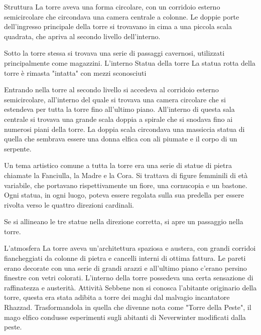 \documentclass{article}
\begin{document}
Struttura\newline
La torre aveva una forma circolare, con un corridoio esterno semicircolare che circondava una camera centrale a colonne. Le doppie porte dell'ingresso principale della torre si trovavano in cima a una piccola scala quadrata, che apriva al secondo livello dell'interno.

Sotto la torre stessa si trovava una serie di passaggi cavernosi, utilizzati principalmente come magazzini.\newline
L'interno\newline
Statua della torre
La statua rotta della torre è rimasta "intatta" con mezzi sconosciuti

Entrando nella torre al secondo livello si accedeva al corridoio esterno semicircolare, all'interno del quale si trovava una camera circolare che si estendeva per tutta la torre fino all'ultimo piano. All'interno di questa sala centrale si trovava una grande scala doppia a spirale che si snodava fino ai numerosi piani della torre. La doppia scala circondava una massiccia statua di quella che sembrava essere una donna elfica con ali piumate e il corpo di un serpente.

Un tema artistico comune a tutta la torre era una serie di statue di pietra chiamate la Fanciulla, la Madre e la Cora. Si trattava di figure femminili di età variabile, che portavano rispettivamente un fiore, una cornucopia e un bastone. Ogni statua, in ogni luogo, poteva essere regolata sulla sua predella per essere rivolta verso le quattro direzioni cardinali.

Se si allineano le tre statue nella direzione corretta, si apre un passaggio nella torre.

L'atmosfera\newline
La torre aveva un'architettura spaziosa e austera, con grandi corridoi fiancheggiati da colonne di pietra e cancelli interni di ottima fattura. Le pareti erano decorate con una serie di grandi arazzi e all'ultimo piano c'erano persino finestre con vetri colorati. L'interno della torre possedeva una certa sensazione di raffinatezza e austerità.\newline
Attività\newline
Sebbene non si conosca l'abitante originario della torre, questa era stata adibita a torre dei maghi dal malvagio incantatore Rhazzad. Trasformandola in quella che divenne nota come "Torre della Peste", il mago elfico condusse esperimenti sugli abitanti di Neverwinter modificati dalla peste.
\end{document}
